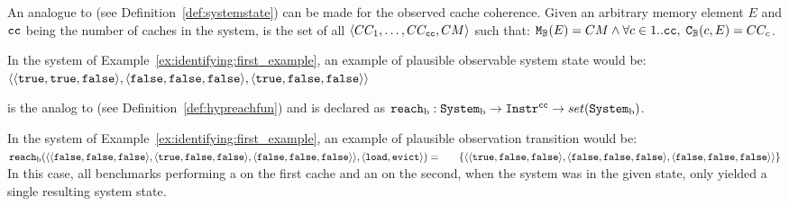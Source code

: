 \begin{definition}
\label{def:identifying:observable_system_state}
An analogue to \systemstate{} (see Definition~\ref{def:systemstate}) can be made
for the observed cache coherence.
Given an arbitrary memory element $E$ and $\text{\texttt{cc}}$ being the number of
caches in the system, \obssystemstate{} is the set of all $\langle{}CC_1,
\ldots, CC_{\text{\texttt{cc}}}, CM\rangle{}$ such that:
   $
      \coherencemanagerboolstatefun{}(E) = CM \land
      \forallin{c}{1..\cachecount}{%
         \cacheboolstatefun(c, E) = CC_c
      }
   $.
\end{definition}
\begin{example}
In the system of Example~\ref{ex:identifying:first_example}, an example of
plausible observable system state would be:\\
$\langle{} \langle \texttt{true}, \texttt{true}, \texttt{false} \rangle,
\langle \texttt{false}, \texttt{false}, \texttt{false} \rangle,
\langle \texttt{true}, \texttt{false}, \texttt{false} \rangle\rangle$
\end{example}

\begin{definition}
\label{def:identifying:observable_system_transitions}
   \obsreachfun{} is the analog to \hypreachfun{} (see
   Definition~\ref{def:hypreachfun}) and is declared as
   $\text{\texttt{reach}\textsubscript{b}}{}: \text{\texttt{System}\textsubscript{b}}{} \to \text{\texttt{Instr}}{}^{\text{\texttt{cc}}}{}{} \to
   set(\text{\texttt{System}\textsubscript{b}}{})$.
\end{definition}
\begin{example}
In the system of Example~\ref{ex:identifying:first_example}, an example of
plausible observation transition would be:\\
$\text{\texttt{reach}\textsubscript{b}}{}(
\langle
   \langle \texttt{false}, \texttt{false}, \texttt{false}\rangle,
   \langle \texttt{true}, \texttt{false}, \texttt{false}\rangle,
   \langle \texttt{false}, \texttt{false}, \texttt{false}\rangle
\rangle,
\langle\text{\texttt{load}}{}, \text{\texttt{evict}}{}\rangle) =\\
~~\quad\{\langle
\langle \texttt{true}, \texttt{false}, \texttt{false}\rangle,
\langle \texttt{false}, \texttt{false}, \texttt{false}\rangle,
\langle \texttt{false}, \texttt{false}, \texttt{false}\rangle
\rangle\}$\\
In this case, all benchmarks performing a \loadinstr{} on the first cache and
an \evictinstr{} on the second, when the system was in the given state, only
yielded a single resulting system state.
\end{example}

